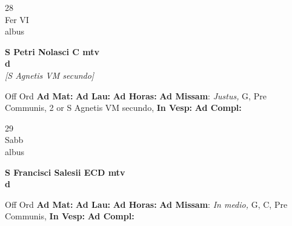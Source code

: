 \documentclass[10pt, openany]{book}
\begin{document}
        \begin{center}
            \begin{minipage}{3.5in}
                \vspace{2em}
                \begin{minipage}{0.5in}
                    {\Huge 28} \\
                    {\normalsize Fer VI} \\
                    {\normalsize albus}
                \end{minipage}
                \begin{minipage}{3.0in}
                    \textbf{ \large S Petri Nolasci C mtv \\
                    \textnormal{\normalsize d}} \\ \textit{[S Agnetis VM secundo]} \\ 
                \end{minipage}
                \begin{justify}Off Ord
                    \textbf{Ad Mat: }
                    \textbf{Ad Lau: }
                    \textbf{Ad Horas: }\textbf{Ad Missam}: \textit{Justus,} G, Pre Communis, 2 or S Agnetis VM secundo,  
                    \textbf{In Vesp: }
                    \textbf{Ad Compl: }
                \end{justify}
            \end{minipage}
        \end{center}
    
        \begin{center}
            \begin{minipage}{3.5in}
                \vspace{2em}
                \begin{minipage}{0.5in}
                    {\Huge 29} \\
                    {\normalsize Sabb} \\
                    {\normalsize albus}
                \end{minipage}
                \begin{minipage}{3.0in}
                    \textbf{ \large S Francisci Salesii ECD mtv \\
                    \textnormal{\normalsize d}} \\ 
                \end{minipage}
                \begin{justify}Off Ord
                    \textbf{Ad Mat: }
                    \textbf{Ad Lau: }
                    \textbf{Ad Horas: }\textbf{Ad Missam}: \textit{In medio,} G, C, Pre Communis,  
                    \textbf{In Vesp: }
                    \textbf{Ad Compl: }
                \end{justify}
            \end{minipage}
        \end{center}
    
\end{document}
